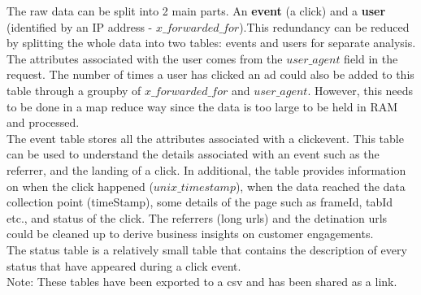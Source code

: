 \documentclass[11pt]{article}
\begin{document}
The raw data can be split into 2 main parts. An \textbf{event} (a click) and a \textbf{user} (identified by an IP address - \(x\_forwarded\_for\)).This redundancy can be reduced by splitting the
whole data into two tables: events and users for separate analysis. \\

The attributes associated with the user comes from the \(user\_agent\) field in the request. The number of times a user has clicked an ad could also be added to this table through a groupby
of \(x\_forwarded\_for\) and \(user\_agent\). However, this needs to be done in a map reduce way since the data is too large to be held in RAM and processed.\\

The event table stores all the attributes associated with a clickevent.
This table can be used to understand the details associated with an event such as the referrer, and the landing of a click. In additional, the table provides information on when the click
happened (\(unix\_timestamp\)), when the data reached the data collection point (timeStamp), some details of the page such as frameId, tabId etc., and status of the click. 
The referrers (long urls) and the detination urls could be cleaned up to derive business insights on customer engagements. \\

The status table is a relatively small table that contains the description of every status that have appeared during a click event. \\


Note: These tables have been exported to a csv and has been shared as a link. \\
\end{document}
